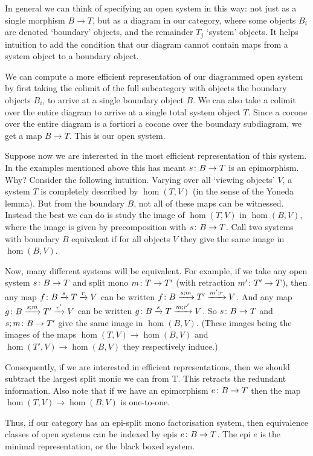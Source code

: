 In general we can think of specifying an open system in this way: not just as a
single morphism $B \to T$, but as a diagram in our category, where some objects
$B_i$ are denoted `boundary' objects, and the remainder $T_j$ `system' objects. It
helps intuition to add the condition that our diagram cannot contain maps from a
system object to a boundary object.

We can compute a more efficient representation of our diagrammed open system by
first taking the colimit of the full subcategory with objects the boundary
objects $B_i$, to arrive at a single boundary object $B$. We can also take a
colimit over the entire diagram to arrive at a single total system object $T$.
Since a cocone over the entire diagram is a fortiori a cocone over the boundary
subdiagram, we get a map $B \to T$. This is our open system.

Suppose now we are interested in the most efficient representation of this
system. In the examples mentioned above this has meant $s{\colon} B \to T$ is an
epimorphism. Why? Consider the following intuition. Varying over all `viewing
objects' $V$, a system $T$ is completely described by $\hom(T,V)$ (in the sense
of the Yoneda lemma).  But from the boundary $B$, not all of these maps can
be witnessed. Instead the best we can do is study the image of $\hom(T,V)$ in
$\hom(B,V)$, where the image is given by precomposition with $s{\colon} B \to T$.
Call two systems with boundary $B$ equivalent if for all objects $V$ they give
the same image in $\hom(B,V)$.

Now, many different systems will be equivalent. For example, if we take any open
system $s{\colon} B \to T$ and split mono $m{\colon} T \to T'$ (with retraction
$m'{\colon} T' \to T$), then any map $f{\colon} B \xrightarrow{s} T \xrightarrow{r} V$
can be written $f{\colon} B \xrightarrow{s;m} T' \xrightarrow{m';r} V$.  And any
map $g{\colon} B \xrightarrow{s;m} T' \xrightarrow{r'}V$ can be written $g{\colon} B
\xrightarrow{s} T \xrightarrow{m;r'} V$. So $s{\colon} B \to T$ and $s;m{\colon} B \to
T'$ give the same image in $\hom(B,V)$.  (These images being the images of the
maps $\hom(T,V) \to \hom(B,V)$ and $\hom(T',V) \to \hom(B,V)$ they respectively
induce.)

Consequently, if we are interested in efficient representations, then we should
subtract the largest split monic we can from T. This retracts the redundant
information. Also note that if we have an epimorphism $e{\colon} B \to T$ then the
map $\hom(T,V) \to \hom(B,V)$ is one-to-one.

Thus, if our category has an epi-split mono factorisation system, then
equivalence classes of open systems can be indexed by epis $e{\colon} B \to T$. The
epi $e$ is the minimal representation, or the black boxed system.

